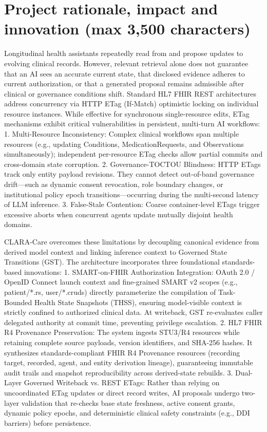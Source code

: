 \documentclass[10pt,letterpaper]{article}
\begin{document}
\section{Project rationale, impact and innovation (max 3,500 characters)}
Longitudinal health assistants repeatedly read from and propose updates to evolving clinical records. However, relevant retrieval alone does not guarantee that an AI sees an accurate current state, that disclosed evidence adheres to current authorization, or that a generated proposal remains admissible after clinical or governance conditions shift. Standard HL7 FHIR REST architectures address concurrency via HTTP ETag (If-Match) optimistic locking on individual resource instances. While effective for synchronous single-resource edits, ETag mechanisms exhibit critical vulnerabilities in persistent, multi-turn AI workflows:
1. Multi-Resource Inconsistency: Complex clinical workflows span multiple resources (e.g., updating Conditions, MedicationRequests, and Observations simultaneously); independent per-resource ETag checks allow partial commits and cross-domain state corruption.
2. Governance-TOCTOU Blindness: HTTP ETags track only entity payload revisions. They cannot detect out-of-band governance drift---such as dynamic consent revocation, role boundary changes, or institutional policy epoch transitions---occurring during the multi-second latency of LLM inference.
3. False-Stale Contention: Coarse container-level ETags trigger excessive aborts when concurrent agents update mutually disjoint health domains.

CLARA-Care overcomes these limitations by decoupling canonical evidence from derived model context and linking inference context to Governed State Transitions (GST). The architecture incorporates three foundational standards-based innovations:
1. SMART-on-FHIR Authorization Integration: OAuth 2.0 / OpenID Connect launch context and fine-grained SMART v2 scopes (e.g., patient/*.rs, user/*.cruds) directly parameterize the compilation of Task-Bounded Health State Snapshots (THSS), ensuring model-visible context is strictly confined to authorized clinical data. At writeback, GST re-evaluates caller delegated authority at commit time, preventing privilege escalation.
2. HL7 FHIR R4 Provenance Preservation: The system ingests STU3/R4 resources while retaining complete source payloads, version identifiers, and SHA-256 hashes. It synthesizes standards-compliant FHIR R4 Provenance resources (recording target, recorded, agent, and entity derivation lineage), guaranteeing immutable audit trails and snapshot reproducibility across derived-state rebuilds.
3. Dual-Layer Governed Writeback vs. REST ETags: Rather than relying on uncoordinated ETag updates or direct record writes, AI proposals undergo two-layer validation that re-checks base state freshness, active consent grants, dynamic policy epochs, and deterministic clinical safety constraints (e.g., DDI barriers) before persistence.
\end{document}
